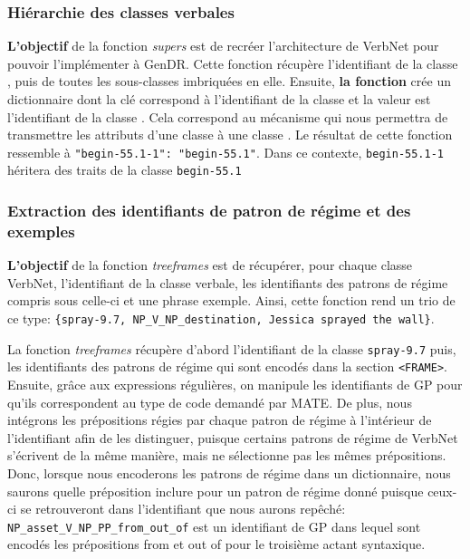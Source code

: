 \subsubsection{Hiérarchie des classes verbales}

\textbf{L'objectif} de la fonction \emph{supers} est de recréer l'architecture de VerbNet pour pouvoir l'implémenter à GenDR. Cette fonction récupère l'identifiant de la classe , puis de toutes les sous-classes imbriquées en elle. Ensuite, \textbf{la fonction} crée un dictionnaire dont la clé correspond à l'identifiant de la classe  et la valeur est l'identifiant de la classe . Cela correspond au mécanisme qui nous permettra de transmettre les attributs d'une classe  à une classe . Le résultat de cette fonction ressemble à \lstinline|"begin-55.1-1": "begin-55.1"|. Dans ce contexte, \texttt{begin-55.1-1} héritera des traits de la classe \texttt{begin-55.1}

\subsubsection{Extraction des identifiants de patron de régime et des exemples}

\textbf{L'objectif} de la fonction \emph{treeframes} est de récupérer, pour chaque classe VerbNet, l'identifiant de la classe verbale, les identifiants des patrons de régime compris sous celle-ci et une phrase exemple. Ainsi, cette fonction rend un trio de ce type: \lstinline|{spray-9.7, NP_V_NP_destination, Jessica sprayed the wall}|.

La fonction \emph{treeframes} récupère d'abord l'identifiant de la classe \texttt{spray-9.7} puis, les identifiants des patrons de régime qui sont encodés dans la section \texttt{<FRAME>}. Ensuite, grâce aux expressions régulières, on manipule les identifiants de \ac{GP} pour qu'ils correspondent au type de code demandé par MATE. De plus, nous intégrons les prépositions régies par chaque patron de régime à l'intérieur de l'identifiant afin de les distinguer, puisque certains patrons de régime de VerbNet s'écrivent de la même manière, mais ne sélectionne pas les mêmes prépositions. Donc, lorsque nous encoderons les patrons de régime dans un dictionnaire, nous saurons quelle préposition inclure pour un patron de régime donné puisque ceux-ci se retrouveront dans l'identifiant que nous aurons repêché: \texttt{NP\_asset\_V\_NP\_PP\_from\_out\_of} est un identifiant de \ac{GP} dans lequel sont encodés les prépositions from et out of pour le troisième actant syntaxique.  

